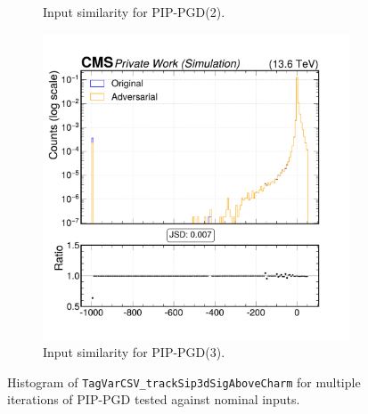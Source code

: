 \begin{figure}[htbp]
\begin{subfigure}[t]{0.32\textwidth}
    \caption*{Input similarity for PIP-PGD(2).}
  \end{subfigure}\hfill
  \begin{subfigure}[t]{0.32\textwidth}
    \includegraphics[width=\linewidth]{media/output/features/compare/combined_it_3/cmp_global_features_TagVarCSV_trackSip3dSigAboveCharm.pdf}
    \caption*{Input similarity for PIP-PGD(3).}
  \end{subfigure}

  \caption*{Histogram of \texttt{TagVarCSV\_trackSip3dSigAboveCharm} for multiple iterations of PIP-PGD tested against nominal inputs.}
  \label{fig:combined_input_TagVarCSV_trackSip3dSigAboveCharm}
\end{figure}

